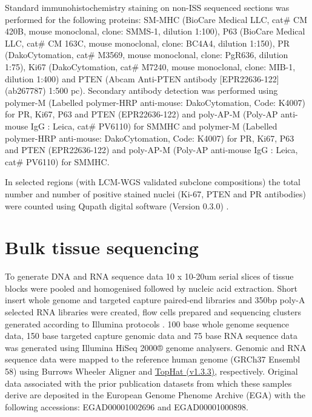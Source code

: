 Standard immunohistochemistry staining on non-\ac{ISS} sequenced sections was performed for the following proteins: SM-MHC (BioCare Medical LLC, cat\# CM 420B, mouse monoclonal, clone: SMMS-1, dilution 1:100), P63 (BioCare Medical LLC, cat\# CM 163C, mouse monoclonal, clone: BC4A4, dilution 1:150), PR (DakoCytomation, cat\# M3569, mouse monoclonal, clone: PgR636, dilution 1:75), Ki67 (DakoCytomation, cat\# M7240, mouse monoclonal, clone: MIB-1, dilution 1:400) and PTEN (Abcam Anti-PTEN antibody [EPR22636-122] (ab267787) 1:500 pc). Secondary antibody detection was performed using polymer-M (Labelled polymer-HRP anti-mouse: DakoCytomation, Code: K4007) for PR, Ki67, P63 and PTEN (EPR22636-122) and poly-AP-M (Poly-AP anti-mouse IgG : Leica, cat\# PV6110) for SMMHC and polymer-M (Labelled polymer-HRP anti-mouse: DakoCytomation, Code: K4007) for PR, Ki67, P63 and PTEN (EPR22636-122) and poly-AP-M (Poly-AP anti-mouse IgG : Leica, cat\# PV6110) for SMMHC.

In selected regions (with \ac{LCM}-\ac{WGS} validated subclone compositions) the total number and number of positive stained nuclei (Ki-67, PTEN and PR antibodies) were counted using Qupath digital software (Version 0.3.0) \parencite{Bankhead2017-px}.

\section{Bulk tissue sequencing}
\label{sec:protocol-suppl-bulk-seq}

To generate DNA and RNA sequence data 10 x 10-20um serial slices of tissue blocks were pooled and homogenised followed by nucleic acid extraction. Short insert whole genome and targeted capture paired-end libraries and 350bp poly-A selected RNA libraries were created, flow cells prepared and sequencing clusters generated according to Illumina protocols \parencite{Kozarewa2009-yj}. 100 base whole genome sequence data, 150 base targeted capture genomic data and 75 base RNA sequence data was generated using Illumina HiSeq 2000® genome analysers. Genomic and RNA sequence data were mapped to the reference human genome (GRCh37 Ensembl 58) using Burrows Wheeler Aligner \parencite{Li2009-aq} and \href{http://ccb.jhu.edu/software/tophat/index.shtml}{TopHat (v1.3.3)}, respectively. Original data associated with the prior publication datasets from which these samples derive are deposited in the European Genome Phenome Archive (EGA) with the following accessions: EGAD00001002696 and EGAD00001000898.

